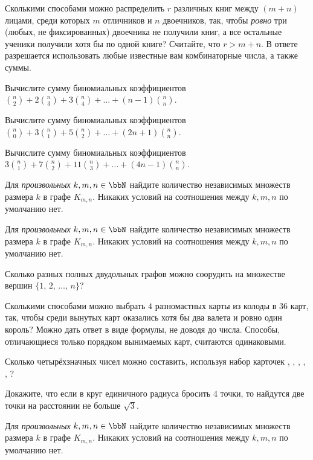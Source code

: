 Сколькими способами можно распределить $r$ различных книг между $(m+n)$ лицами, среди которых $m$ отличников и $n$ двоечников, так, чтобы \emph{ровно} три (любых, не фиксированных) двоечника не получили книг, а все остальные ученики получили хотя бы по одной книге? Считайте, что $r>m+n$. В ответе разрешается использовать любые известные вам комбинаторные числа, а также суммы.


Вычислите сумму биномиальных коэффициентов $\binom{n}{2}+2\binom{n}{3}+3\binom{n}{4}+\ldots+(n-1)\binom{n}{n}$.


Вычислите сумму биномиальных коэффициентов $\binom{n}{0}+3\binom{n}{1}+5\binom{n}{2}+\ldots+(2n+1)\binom{n}{n}$.


Вычислите сумму биномиальных коэффициентов $3\binom{n}{1}+7\binom{n}{2}+11\binom{n}{3}+\ldots+(4n-1)\binom{n}{n}$.


Для \emph{произвольных} $k,m,n\in\bbN$ найдите количество независимых множеств размера $k$ в графе $K_{m,n}$. Никаких условий на соотношения между $k,m,n$ по умолчанию нет.


Для \emph{произвольных} $k,m,n\in\bbN$ найдите количество независимых множеств размера $k$ в графе $K_{m,n}$. Никаких условий на соотношения между $k,m,n$ по умолчанию нет.


Сколько разных полных двудольных графов можно соорудить на множестве вершин $\{1,\,2,\,\ldots,\,n\}$?


Сколькими способами можно выбрать $4$ разномастных карты из колоды в $36$ карт, так, чтобы среди вынутых карт оказались хотя бы два валета и ровно один король? Можно дать ответ в виде формулы, не доводя до числа. Способы, отличающиеся только порядком вынимаемых карт, считаются одинаковыми.


Сколько четырёхзначных чисел можно составить, используя набор карточек , , , , , ?


Докажите, что если в круг единичного радиуса бросить $4$ точки, то найдутся две точки на расстоянии не больше $\sqrt{3}$.


Для \emph{произвольных} $k,m,n\in\bbN$ найдите количество независимых множеств размера $k$ в графе $K_{m,n}$. Никаких условий на соотношения между $k,m,n$ по умолчанию нет.


